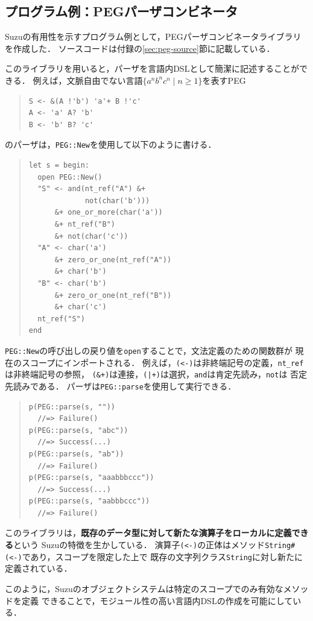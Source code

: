 \documentclass{ipsjprosym}
\begin{document}
\subsection{プログラム例：PEGパーザコンビネータ}

Suzuの有用性を示すプログラム例として，PEGパーザコンビネータライブラリを作成した．
ソースコードは付録の\ref{sec:peg-source}節に記載している．

このライブラリを用いると，パーザを言語内DSLとして簡潔に記述することができる．
例えば，文脈自由でない言語$\{a^n b^n c^n \mid n \ge 1\}$を表すPEG
\begin{quote}
\begin{verbatim}
S <- &(A !'b') 'a'+ B !'c'
A <- 'a' A? 'b'
B <- 'b' B? 'c'
\end{verbatim}
\end{quote}
のパーザは，\verb|PEG::New|を使用して以下のように書ける．
\begin{quote}
\begin{verbatim}
let s = begin:
  open PEG::New()
  "S" <- and(nt_ref("A") &+
             not(char('b')))
      &+ one_or_more(char('a'))
      &+ nt_ref("B")
      &+ not(char('c'))
  "A" <- char('a')
      &+ zero_or_one(nt_ref("A"))
      &+ char('b')
  "B" <- char('b')
      &+ zero_or_one(nt_ref("B"))
      &+ char('c')
  nt_ref("S")
end
\end{verbatim}
\end{quote}
\verb|PEG::New|の呼び出しの戻り値を\verb|open|することで，文法定義のための関数群が
現在のスコープにインポートされる．
例えば，\verb|(<-)|は非終端記号の定義，\verb|nt_ref|は非終端記号の参照，
\verb|(&+)|は連接，\verb/(|+)/は選択，\verb|and|は肯定先読み，\verb|not|は
否定先読みである．
パーザは\verb|PEG::parse|を使用して実行できる．
\begin{quote}
\begin{verbatim}
p(PEG::parse(s, ""))
  //=> Failure()
p(PEG::parse(s, "abc"))
  //=> Success(...)
p(PEG::parse(s, "ab"))
  //=> Failure()
p(PEG::parse(s, "aaabbbccc"))
  //=> Success(...)
p(PEG::parse(s, "aabbbccc"))
  //=> Failure()
\end{verbatim}
\end{quote}

このライブラリは，\textbf{既存のデータ型に対して新たな演算子をローカルに定義できる}という
Suzuの特徴を生かしている．
演算子\verb|(<-)|の正体はメソッド\verb|String#(<-)|であり，スコープを限定した上で
既存の文字列クラス\verb|String|に対し新たに定義されている．

このように，Suzuのオブジェクトシステムは特定のスコープでのみ有効なメソッドを定義
できることで，モジュール性の高い言語内DSLの作成を可能にしている．
\end{document}
